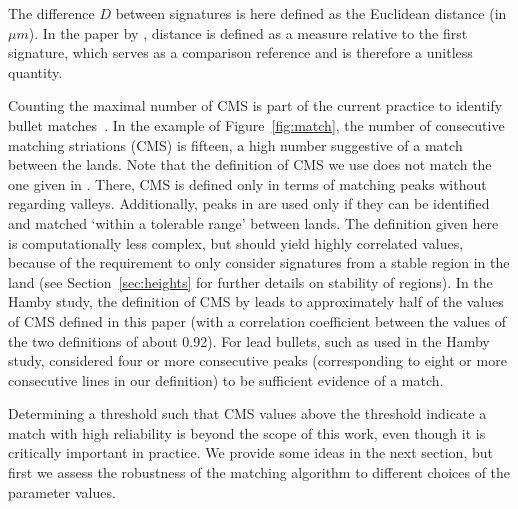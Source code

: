 \documentclass[aoas, preprint]{imsart}\usepackage[]{graphicx}\usepackage[]{color}
\begin{document}
%
The difference $D$ between signatures is here defined as the Euclidean distance (in $\mu m$). In the paper by \citet{ma:2004}, distance is defined as a measure relative to the first signature, which serves as a comparison reference and is therefore a unitless quantity. 

Counting the maximal number of CMS is part of the current practice to identify bullet matches~\citep{nichols:1997, nichols:2003, nichols:2003b}. 
In the example of Figure~\ref{fig:match}, the number of consecutive matching striations (CMS) is fifteen, a high number suggestive of a match between the lands. Note that the definition of CMS we use does not match the one given in \citet{thompson:2013}. There, CMS is defined only in terms of matching peaks without regarding valleys. Additionally, peaks in  \citet{thompson:2013} are  used only if they can be identified and matched `within a tolerable range' between lands. The definition given here is computationally less complex, but should yield highly correlated values, because of the requirement to only consider signatures from a stable region in the land (see Section~\ref{sec:heights} for further details on stability of regions). In the Hamby study, the definition of CMS by \citet{thompson:2013} leads to approximately half of the values of CMS defined in this paper (with a correlation coefficient between the values of the two definitions of about 0.92). 
For lead bullets, such as used in the Hamby study, \citet{biasotti:1959} considered four or more consecutive peaks (corresponding to eight or more consecutive lines in our definition) to be sufficient evidence of a match.  %

Determining a threshold such that CMS values above the threshold indicate a match with high reliability is beyond the scope of this work, even though it is critically important in practice. We provide some ideas in the next section, but first we assess the robustness of the matching algorithm to different choices of the parameter values. 
\end{document}

